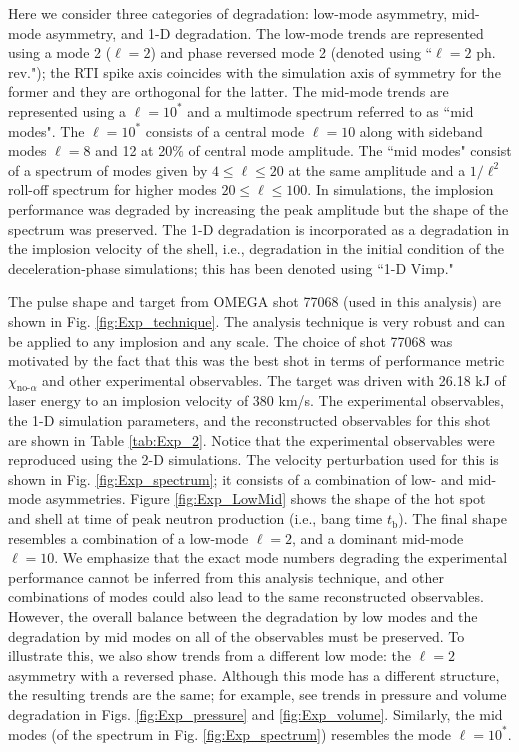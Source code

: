 \documentclass[aip,reprint]{revtex4-1}
\begin{document}
Here we consider three categories of degradation: low-mode asymmetry, mid-mode asymmetry, and 1-D degradation. The low-mode trends are represented using a mode 2 ($\ell=2$) and phase reversed mode 2 (denoted using ``$\ell=2$ ph. rev."); the RTI spike axis coincides with the simulation axis of symmetry for the former and they are orthogonal for the latter. The mid-mode trends are represented using a $\ell=10^*$ and a multimode spectrum referred to as ``mid modes". The $\ell=10^*$ consists of a central mode $\ell=10$ along with sideband modes $\ell=8$ and 12 at 20$\%$ of central mode amplitude. The ``mid modes" consist of a spectrum of modes given by $4 \leq \ell \leq 20$ at the same amplitude and a $1/\ell^2$ roll-off spectrum for higher modes $20 \leq \ell \leq 100$. In simulations, the implosion performance was degraded by increasing the peak amplitude but the shape of the spectrum was preserved. The 1-D degradation is incorporated as a degradation in the implosion velocity of the shell, i.e., degradation in the initial condition of the deceleration-phase simulations; this has been denoted using ``1-D Vimp."    
%
%

  The pulse shape and target from OMEGA shot 77068 (used in this analysis) are shown in Fig. \ref{fig:Exp_technique}. The analysis technique is very robust and can be applied to any implosion and any scale. The choice of shot 77068 was motivated by the fact that this was the best shot in terms of performance metric $\chi_{\text{no-}\alpha}$\cite{Exp_Bose, Betti-alphaheat} and other experimental observables. The target was driven with 26.18 kJ of laser energy to an implosion velocity of 380 km/s. The experimental observables, the 1-D simulation parameters, and the reconstructed observables for this shot are shown in Table \ref{tab:Exp_2}. Notice that the experimental observables were reproduced using the 2-D simulations. The velocity perturbation used for this is shown in Fig. \ref{fig:Exp_spectrum}; it consists of a combination of low- and mid-mode asymmetries. Figure \ref{fig:Exp_LowMid} shows the shape of the hot spot and shell at time of peak neutron production (i.e., bang time $t_\text{b}$). The final shape resembles a combination of a low-mode $\ell=2$, and a dominant mid-mode $\ell=10$. We emphasize that the exact mode numbers degrading the experimental performance cannot be inferred from this analysis technique, and other combinations of modes could also lead to the same reconstructed observables. However, the overall balance between the degradation by low modes and the degradation by mid modes on all of the observables must be preserved. To illustrate this, we also show trends from a different low mode: the $\ell=2$ asymmetry with a reversed phase. Although this mode has a different structure, the resulting trends are the same; for example, see trends in pressure and volume degradation in Figs. \ref{fig:Exp_pressure} and \ref{fig:Exp_volume}. Similarly, the mid modes (of the spectrum in Fig. \ref{fig:Exp_spectrum}) resembles the mode $\ell=10^*$.        
\end{document}
